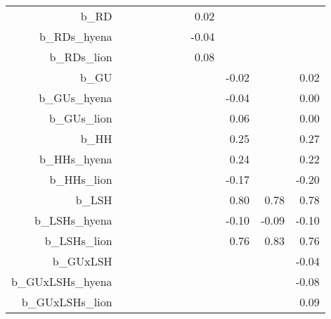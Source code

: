 \begin{table}[ht]
\begin{tabular}{rrrrrrrrrrr}
  b\_RD &  &  &  &  &  &  & 0.02 &  &  &  \\ 
  b\_RDs\_hyena &  &  &  &  &  &  & -0.04 &  &  &  \\ 
  b\_RDs\_lion &  &  &  &  &  &  & 0.08 &  &  &  \\ 
  b\_GU &  &  &  &  &  &  &  & -0.02 &  & 0.02 \\ 
  b\_GUs\_hyena &  &  &  &  &  &  &  & -0.04 &  & 0.00 \\ 
  b\_GUs\_lion &  &  &  &  &  &  &  & 0.06 &  & 0.00 \\ 
  b\_HH &  &  &  &  &  &  &  & 0.25 &  & 0.27 \\ 
  b\_HHs\_hyena &  &  &  &  &  &  &  & 0.24 &  & 0.22 \\ 
  b\_HHs\_lion &  &  &  &  &  &  &  & -0.17 &  & -0.20 \\ 
  b\_LSH &  &  &  &  &  &  &  & 0.80 & 0.78 & 0.78 \\ 
  b\_LSHs\_hyena &  &  &  &  &  &  &  & -0.10 & -0.09 & -0.10 \\ 
  b\_LSHs\_lion &  &  &  &  &  &  &  & 0.76 & 0.83 & 0.76 \\ 
  b\_GUxLSH &  &  &  &  &  &  &  &  &  & -0.04 \\ 
  b\_GUxLSHs\_hyena &  &  &  &  &  &  &  &  &  & -0.08 \\ 
  b\_GUxLSHs\_lion &  &  &  &  &  &  &  &  &  & 0.09 \\ 
   \hline
\end{tabular}
\end{table}
